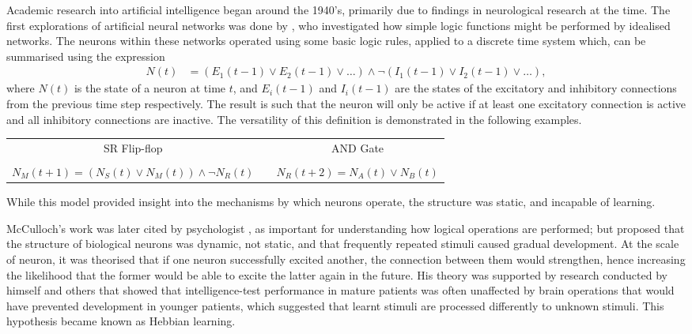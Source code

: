 Academic research into artificial intelligence began around the 1940's,
primarily due to findings in neurological research at the time.
The first explorations of artificial neural networks was done by
\cite{McCulloch:1943:Logical}, who investigated how simple logic functions
might be performed by idealised networks.
The neurons within these networks operated using some basic logic rules, applied
to a discrete time system which, can be summarised using the expression
\begin{align*}
    N(t) &= (E_1(t-1) \vee E_2(t-1) \vee \dots)
        \wedge \neg(I_1(t-1) \vee I_2(t-1) \vee \dots),
\end{align*}
where $N(t)$ is the state of a neuron at time $t$, and $E_i(t-1)$ and $I_i(t-1)$
are the states of the excitatory and inhibitory connections from the previous
time step respectively.
The result is such that the neuron will only be active if at least one
excitatory connection is active and all inhibitory connections are inactive.
The versatility of this definition is demonstrated in the following examples.
\begin{center}
    \begin{tabular}{ccc}
        SR Flip-flop & & AND Gate\\
         & & \\
        $\displaystyle N_M(t+1) = (N_S(t) \vee N_M(t)) \wedge\neg N_R(t)$ &
        &
        $\displaystyle N_R(t+2) = N_A(t) \vee N_B(t)$\\
    \end{tabular}
    \parbox{0.9\textwidth}{%
    }
\end{center}
While this model provided insight into the mechanisms by which neurons operate,
the structure was static, and incapable of learning.



McCulloch's work was later cited by psychologist \cite{Hebb:1949:Organization},
as important for understanding how logical operations are performed; but
proposed that the structure of biological neurons was dynamic, not static, and
that frequently repeated stimuli caused gradual development.
At the scale of neuron, it was theorised that if one neuron successfully
excited another, the connection between them would strengthen, hence
increasing the likelihood that the former would be able to excite the latter
again in the future.
His theory was supported by research conducted by himself and others that showed
that intelligence-test performance in mature patients was often unaffected by
brain operations that would have prevented development in younger patients,
which suggested that learnt stimuli are processed differently to unknown
stimuli.
This hypothesis became known as Hebbian learning.



